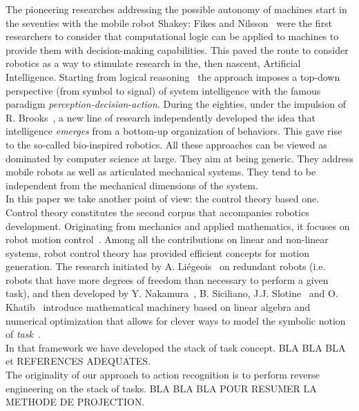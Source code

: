 \documentclass[letterpaper, 10pt, conference]{ieeeconf}      %
\begin{document}
The pioneering researches addressing the possible autonomy of machines
start in the seventies with the mobile robot Shakey: Fikes and Nilsson~\cite{fikes71}
were the first researchers to consider that computational logic can be
applied to machines to provide them with decision-making capabilities.
This paved the route to consider robotics as a way to stimulate research
in the, then nascent, Artificial Intelligence. Starting from logical
reasoning~\cite{ghallab04} the approach imposes a top-down perspective (from symbol to
signal) of system intelligence with the famous paradigm
\emph{perception-decision-action}. During the eighties, under the impulsion
of R. Brooks~\cite{brooks86}, a new line of research independently developed the idea
that intelligence \emph{emerges} from a bottom-up organization of behaviors.
This gave rise to the so-called bio-inspired robotics. All these
approaches can be viewed as dominated by computer science at large. They
aim at being generic. They address mobile robots as well as articulated
mechanical systems. They tend to be independent from the mechanical
dimensions of the system.\\

In this paper we take another point of view: the control theory based
one. Control theory constitutes the second corpus that accompanies
robotics development. Originating from mechanics and applied
mathematics, it focuses on robot motion control~\cite{murray94,
siciliano10}. Among all the
contributions on linear and non-linear systems, robot control theory has
provided efficient concepts for motion generation. The research
initiated by A. Li\'egeois~\cite{liegeois77} on redundant robots (i.e. robots that have
more degrees of freedom than necessary to perform a given task), and
then developed by Y. Nakamura~\cite{nakamura91}, B. Siciliano, J.J. Slotine~\cite{siciliano91} and O.
Khatib~\cite{khatib87} introduce mathematical machinery based on linear algebra and
numerical optimization that allows for clever ways to model the symbolic
notion of \emph{task}~\cite{samson91}.\\

In that framework we have developed the stack of task concept. BLA BLA
BLA et REFERENCES ADEQUATES.\\

The originality of our approach to action recognition is to perform
reverse engineering on the stack of tasks. BLA BLA BLA POUR RESUMER LA
METHODE DE PROJECTION.\\
\end{document}
